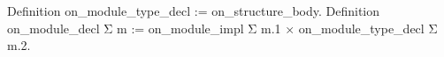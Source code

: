     Definition on_module_type_decl := on_structure_body.
    Definition on_module_decl Σ m := on_module_impl Σ m.1 × on_module_type_decl Σ m.2.